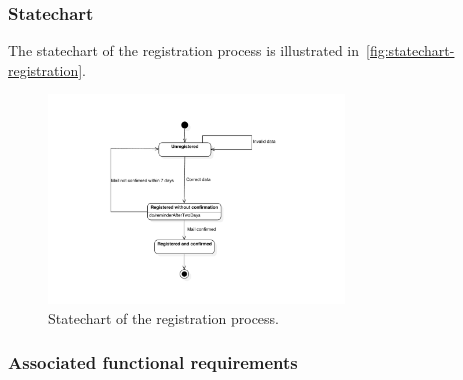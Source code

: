 \subsubsection{Statechart}
The statechart of the registration process is illustrated in~\autoref{fig:statechart-registration}.
\begin{figure}
\begin{center}
\includegraphics[width=0.7\textwidth]{diagrams/statechart_registration.pdf}
\caption{Statechart of the registration process.}
\label{fig:statechart-registration}
\end{center}
\end{figure}

\subsubsection{Associated functional requirements}

